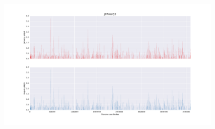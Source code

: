 \begin{figure}[p]
  \centering
  \includegraphics[width=\textwidth,height=\textheight,keepaspectratio]{Chapter5/Figures/pn_ps_plots/J07HWQ2_pNpS_density.pdf}
  \caption{}
  \label{J07HWQ2_pNpS}
\end{figure}



